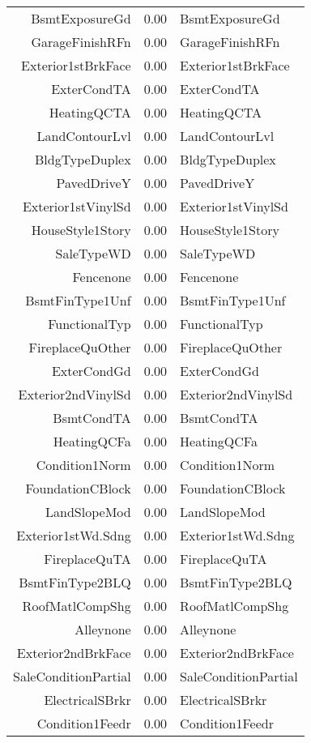 \begin{table}[ht]
\begin{tabular}{rrl}
  BsmtExposureGd & 0.00 & BsmtExposureGd \\ 
  GarageFinishRFn & 0.00 & GarageFinishRFn \\ 
  Exterior1stBrkFace & 0.00 & Exterior1stBrkFace \\ 
  ExterCondTA & 0.00 & ExterCondTA \\ 
  HeatingQCTA & 0.00 & HeatingQCTA \\ 
  LandContourLvl & 0.00 & LandContourLvl \\ 
  BldgTypeDuplex & 0.00 & BldgTypeDuplex \\ 
  PavedDriveY & 0.00 & PavedDriveY \\ 
  Exterior1stVinylSd & 0.00 & Exterior1stVinylSd \\ 
  HouseStyle1Story & 0.00 & HouseStyle1Story \\ 
  SaleTypeWD & 0.00 & SaleTypeWD \\ 
  Fencenone & 0.00 & Fencenone \\ 
  BsmtFinType1Unf & 0.00 & BsmtFinType1Unf \\ 
  FunctionalTyp & 0.00 & FunctionalTyp \\ 
  FireplaceQuOther & 0.00 & FireplaceQuOther \\ 
  ExterCondGd & 0.00 & ExterCondGd \\ 
  Exterior2ndVinylSd & 0.00 & Exterior2ndVinylSd \\ 
  BsmtCondTA & 0.00 & BsmtCondTA \\ 
  HeatingQCFa & 0.00 & HeatingQCFa \\ 
  Condition1Norm & 0.00 & Condition1Norm \\ 
  FoundationCBlock & 0.00 & FoundationCBlock \\ 
  LandSlopeMod & 0.00 & LandSlopeMod \\ 
  Exterior1stWd.Sdng & 0.00 & Exterior1stWd.Sdng \\ 
  FireplaceQuTA & 0.00 & FireplaceQuTA \\ 
  BsmtFinType2BLQ & 0.00 & BsmtFinType2BLQ \\ 
  RoofMatlCompShg & 0.00 & RoofMatlCompShg \\ 
  Alleynone & 0.00 & Alleynone \\ 
  Exterior2ndBrkFace & 0.00 & Exterior2ndBrkFace \\ 
  SaleConditionPartial & 0.00 & SaleConditionPartial \\ 
  ElectricalSBrkr & 0.00 & ElectricalSBrkr \\ 
  Condition1Feedr & 0.00 & Condition1Feedr \\ 

\end{tabular}
\end{table}
